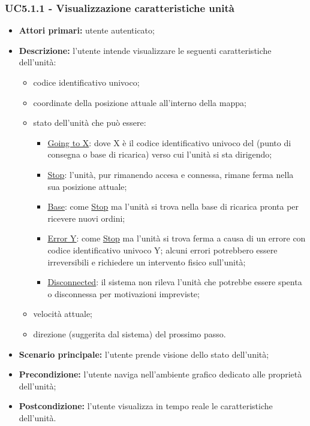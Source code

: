         \subsubsection{UC5.1.1 - Visualizzazione caratteristiche unità}
        \begin{itemize}
            \item \textbf{Attori primari:} utente autenticato;
            \item \textbf{Descrizione:} l'utente intende visualizzare le seguenti caratteristiche dell'unità:
            \begin{itemize}
                \item codice identificativo univoco;
                \item coordinate della posizione attuale all'interno della mappa;
                \item stato dell'unità che può essere:
                \begin{itemize}
                    \item \underline{Going to X}: dove X è il codice identificativo univoco del  (punto di consegna o base di ricarica) verso cui l'unità si sta dirigendo;
                    \item \underline{Stop}: l'unità, pur rimanendo accesa e connessa, rimane ferma nella sua posizione attuale;
                    \item \underline{Base}: come \underline{Stop} ma l'unità si trova nella base di ricarica pronta per ricevere nuovi ordini;
                    \item \underline{Error Y}: come \underline{Stop} ma l'unità si trova ferma a causa di un errore con codice identificativo univoco Y; alcuni errori potrebbero essere irreversibili e richiedere un intervento fisico sull'unità;
                    \item \underline{Disconnected}: il sistema non rileva l'unità che potrebbe essere spenta o disconnessa per motivazioni impreviste;
                \end{itemize}
                \item velocità attuale;
                \item direzione (suggerita dal sistema) del prossimo passo.
            \end{itemize}
            \item \textbf{Scenario principale:} l'utente prende visione dello stato dell'unità;
            \item \textbf{Precondizione:} l'utente naviga nell'ambiente grafico dedicato alle proprietà dell'unità;
            \item \textbf{Postcondizione:} l'utente visualizza in tempo reale le caratteristiche dell'unità.
        \end{itemize}

